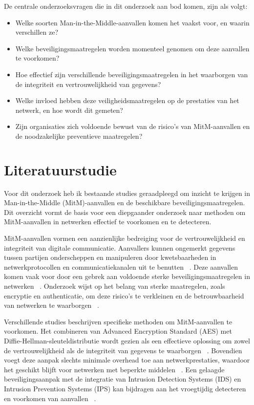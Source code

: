 De centrale onderzoeksvragen die in dit onderzoek aan bod komen, zijn als volgt:

\begin{itemize}
  \item Welke soorten Man-in-the-Middle-aanvallen komen het vaakst voor, en waarin verschillen ze?
  
  \item Welke beveiligingsmaatregelen worden momenteel genomen om deze aanvallen te voorkomen?
  
  \item Hoe effectief zijn verschillende beveiligingsmaatregelen in het waarborgen van de integriteit en vertrouwelijkheid van gegevens?
  \item Welke invloed hebben deze veiligheidsmaatregelen op de prestaties van het netwerk, en hoe wordt dit gemeten?
  
  \item Zijn organisaties zich voldoende bewust van de risico’s van MitM-aanvallen en de noodzakelijke preventieve maatregelen?
\end{itemize}


\section{Literatuurstudie}%
\label{sec:literatuurstudie}
Voor dit onderzoek heb ik bestaande studies geraadpleegd om inzicht te krijgen in Man-in-the-Middle (MitM)-aanvallen en de beschikbare beveiligingsmaatregelen. Dit overzicht vormt de basis voor een diepgaander onderzoek naar methoden om MitM-aanvallen in netwerken effectief te voorkomen en te detecteren.

MitM-aanvallen vormen een aanzienlijke bedreiging voor de vertrouwelijkheid en integriteit van digitale communicatie. Aanvallers kunnen ongemerkt gegevens tussen partijen onderscheppen en manipuleren door kwetsbaarheden in netwerkprotocollen en communicatiekanalen uit te benutten 
~\autocite{ELRAWY2023}. Deze aanvallen komen vaak voor door een gebrek aan voldoende sterke beveiligingsmaatregelen in netwerken  ~\autocite{HALGAMUGE2025}. Onderzoek wijst op het belang van sterke maatregelen, zoals encryptie en authenticatie, om deze risico’s te verkleinen en de betrouwbaarheid van netwerken te waarborgen ~\autocite{ALIYU201824}.

Verschillende studies beschrijven specifieke methoden om MitM-aanvallen te voorkomen. Het combineren van Advanced Encryption Standard (AES) met Diffie-Hellman-sleuteldistributie wordt gezien als een effectieve oplossing om zowel de vertrouwelijkheid als de integriteit van gegevens te waarborgen ~\autocite{ELRAWY2023
}. Bovendien voegt deze aanpak slechts minimale overhead toe aan netwerkprestaties, waardoor het geschikt blijft voor netwerken met beperkte middelen ~\autocite{HALGAMUGE2025}. Een gelaagde beveiligingsaanpak met de integratie van Intrusion Detection Systems (IDS) en Intrusion Prevention Systems (IPS) kan bijdragen aan het vroegtijdig detecteren en voorkomen van aanvallen   ~\autocite{ANKARI2022}.

